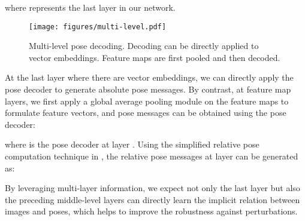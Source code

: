 \documentclass[letterpaper]{article} \usepackage{aaai23}  \usepackage{times}  \usepackage{helvet}  \usepackage{courier}  \usepackage[hyphens]{url}  \usepackage{graphicx} \urlstyle{rm} \def\UrlFont{\rm}  \usepackage{natbib}  \usepackage{caption} \frenchspacing  \setlength{\pdfpagewidth}{8.5in} \setlength{\pdfpageheight}{11in} \usepackage{booktabs}
\theoremstyle{remark}
\theoremstyle{plain}
\begin{document}
where  represents the last layer in our network.

\begin{figure}[!t]
\begin{center}
\texttt{[image: figures/multi-level.pdf]}
\end{center}
\caption{Multi-level pose decoding. Decoding can be directly applied to vector embeddings. Feature maps are first pooled and then decoded.  }
\label{fig:multi-level}
\end{figure}

At the last layer where there are vector embeddings, we can directly apply the pose decoder to generate absolute pose messages. By contrast, at feature map layers,  we first apply a global average pooling module on the feature maps to formulate feature vectors, and pose messages can be obtained using the  pose decoder:

where  is the pose decoder at layer . Using the simplified relative pose computation technique in \cite{atloc}, the relative pose messages  at layer  can be generated as:

By leveraging multi-layer information, we expect not only the last layer but also the preceding middle-level layers can directly learn the implicit relation between images and poses, which helps to improve the robustness against perturbations.
\end{document}
